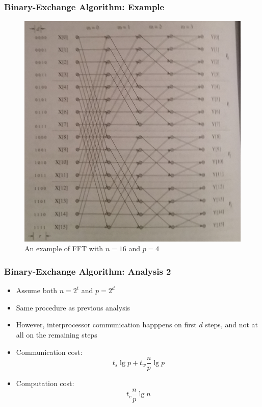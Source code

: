 \documentclass[xcolor=pdftex,dvipsnames,table]{presentation}
\begin{document}
\begin{frame}
	\frametitle{Binary-Exchange Algorithm: Example}

	\begin{figure}
		\centering
		\includegraphics[scale=0.1]{fft.jpg}
		\caption{An example of FFT with $n=16$ and $p=4$}
	\end{figure}
\end{frame}

\begin{frame}
	\frametitle{Binary-Exchange Algorithm: Analysis 2}

	\begin{itemize}
		\item Assume both $n=2^t$ and $p=2^d$
		\item Same procedure as previous analysis
		\item However, interprocessor communication happpens on first $d$ steps, and not at all on the remaining steps
		\item Communication cost:
		\[
			t_s\lg p+ t_w\frac{n}{p}\lg p
		\]
		\item Computation cost:
		\[
			t_c\frac{n}{p}\lg n
		\]
	\end{itemize}
\end{frame}
\end{document}
